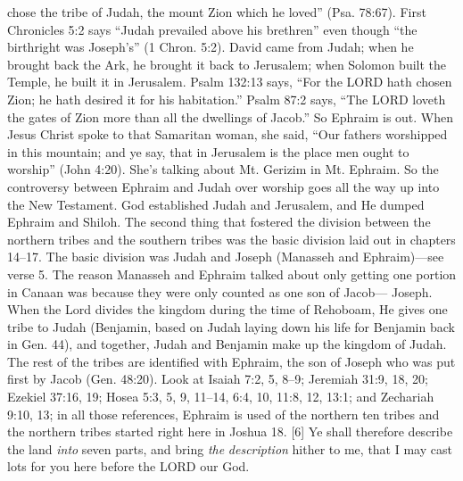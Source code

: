 {chose the tribe of Judah, the mount Zion
which he loved” (Psa. 78:67). First Chronicles
5:2 says “Judah prevailed above his
brethren” even though “the birthright was
Joseph’s” (1 Chron. 5:2). David came from
Judah; when he brought back the Ark, he
brought it back to Jerusalem; when Solomon
built the Temple, he built it in Jerusalem.
Psalm 132:13 says, “For the LORD hath
chosen Zion; he hath desired it for his
habitation.” Psalm 87:2 says, “The LORD
loveth the gates of Zion more than all the
dwellings of Jacob.” So Ephraim is out.
When Jesus Christ spoke to that Samaritan
woman, she said, “Our fathers worshipped in
this mountain; and ye say, that in Jerusalem
is the place men ought to worship” (John
4:20). She’s talking about Mt. Gerizim in Mt.
Ephraim. So the controversy between Ephraim
and Judah over worship goes all the way up into
the New Testament. God established Judah and
Jerusalem, and He dumped Ephraim and
Shiloh.
The second thing that fostered the division
between the northern tribes and the southern
tribes was the basic division laid out in chapters
14–17. The basic division was Judah and
Joseph (Manasseh and Ephraim)—see verse 5.
The reason Manasseh and Ephraim talked about
only getting one portion in Canaan was because
they were only counted as one son of Jacob—
Joseph.
When the Lord divides the kingdom during
the time of Rehoboam, He gives one tribe to
Judah (Benjamin, based on Judah laying down
his life for Benjamin back in Gen. 44), and
together, Judah and Benjamin make up the
kingdom of Judah. The rest of the tribes are
identified with Ephraim, the son of Joseph who
was put first by Jacob (Gen. 48:20). Look at
Isaiah 7:2, 5, 8–9; Jeremiah 31:9, 18, 20;
Ezekiel 37:16, 19; Hosea 5:3, 5, 9, 11–14, 6:4,
10, 11:8, 12, 13:1; and Zechariah 9:10, 13; in
all those references, Ephraim is used of the
northern ten tribes and the northern tribes
started right here in Joshua 18.}
[6] \textcolor[rgb]{0.00,0.00,1.00}{Ye shall therefore describe the land \emph{into} seven parts, and bring \emph{the} \emph{description} hither to me, that I may cast lots for you here before the LORD our God.}
